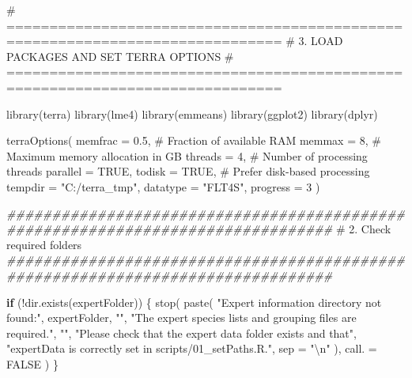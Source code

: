 \documentclass[
  letterpaper,
  DIV=11,
  numbers=noendperiod]{scrartcl}
\newenvironment{Shaded}{\begin{snugshade}}{\end{snugshade}}
\newcommand{\AttributeTok}[1]{\textcolor[rgb]{0.40,0.45,0.13}{#1}}
\newcommand{\CommentTok}[1]{\textcolor[rgb]{0.37,0.37,0.37}{#1}}
\newcommand{\ConstantTok}[1]{\textcolor[rgb]{0.56,0.35,0.01}{#1}}
\newcommand{\ControlFlowTok}[1]{\textcolor[rgb]{0.00,0.23,0.31}{\textbf{#1}}}
\newcommand{\DecValTok}[1]{\textcolor[rgb]{0.68,0.00,0.00}{#1}}
\newcommand{\DocumentationTok}[1]{\textcolor[rgb]{0.37,0.37,0.37}{\textit{#1}}}
\newcommand{\FloatTok}[1]{\textcolor[rgb]{0.68,0.00,0.00}{#1}}
\newcommand{\FunctionTok}[1]{\textcolor[rgb]{0.28,0.35,0.67}{#1}}
\newcommand{\NormalTok}[1]{\textcolor[rgb]{0.00,0.23,0.31}{#1}}
\newcommand{\SpecialCharTok}[1]{\textcolor[rgb]{0.37,0.37,0.37}{#1}}
\newcommand{\StringTok}[1]{\textcolor[rgb]{0.13,0.47,0.30}{#1}}
\begin{document}
\begin{Shaded}
\begin{Highlighting}[]
\CommentTok{\# ==============================================================================}
\CommentTok{\# 3. LOAD PACKAGES AND SET TERRA OPTIONS}
\CommentTok{\# ==============================================================================}

\FunctionTok{library}\NormalTok{(terra)}
\FunctionTok{library}\NormalTok{(lme4)}
\FunctionTok{library}\NormalTok{(emmeans)}
\FunctionTok{library}\NormalTok{(ggplot2)}
\FunctionTok{library}\NormalTok{(dplyr)}

\FunctionTok{terraOptions}\NormalTok{(}
    \AttributeTok{memfrac =} \FloatTok{0.5}\NormalTok{, }\CommentTok{\# Fraction of available RAM}
    \AttributeTok{memmax =} \DecValTok{8}\NormalTok{, }\CommentTok{\# Maximum memory allocation in GB}
    \AttributeTok{threads =} \DecValTok{4}\NormalTok{, }\CommentTok{\# Number of processing threads}
    \AttributeTok{parallel =} \ConstantTok{TRUE}\NormalTok{,}
    \AttributeTok{todisk =} \ConstantTok{TRUE}\NormalTok{, }\CommentTok{\# Prefer disk{-}based processing}
    \AttributeTok{tempdir =} \StringTok{"C:/terra\_tmp"}\NormalTok{,}
    \AttributeTok{datatype =} \StringTok{"FLT4S"}\NormalTok{,}
    \AttributeTok{progress =} \DecValTok{3}
\NormalTok{)}


\DocumentationTok{\#\#\#\#\#\#\#\#\#\#\#\#\#\#\#\#\#\#\#\#\#\#\#\#\#\#\#\#\#\#\#\#\#\#\#\#\#\#\#\#\#\#\#\#\#\#\#\#\#\#\#\#\#\#\#\#\#\#\#\#\#\#\#\#\#\#\#\#\#\#\#\#\#\#\#\#\#\#\#\#}
\CommentTok{\# 2. Check required folders}
\DocumentationTok{\#\#\#\#\#\#\#\#\#\#\#\#\#\#\#\#\#\#\#\#\#\#\#\#\#\#\#\#\#\#\#\#\#\#\#\#\#\#\#\#\#\#\#\#\#\#\#\#\#\#\#\#\#\#\#\#\#\#\#\#\#\#\#\#\#\#\#\#\#\#\#\#\#\#\#\#\#\#\#\#}

\ControlFlowTok{if}\NormalTok{ (}\SpecialCharTok{!}\FunctionTok{dir.exists}\NormalTok{(expertFolder)) \{}
  \FunctionTok{stop}\NormalTok{(}
    \FunctionTok{paste}\NormalTok{(}
      \StringTok{"Expert information directory not found:"}\NormalTok{,}
\NormalTok{      expertFolder,}
      \StringTok{""}\NormalTok{,}
      \StringTok{"The expert species lists and grouping files are required."}\NormalTok{,}
      \StringTok{""}\NormalTok{,}
      \StringTok{"Please check that the expert data folder exists and that"}\NormalTok{,}
      \StringTok{"\textquotesingle{}expertData\textquotesingle{} is correctly set in scripts/01\_setPaths.R."}\NormalTok{,}
      \AttributeTok{sep =} \StringTok{"}\SpecialCharTok{\textbackslash{}n}\StringTok{"}
\NormalTok{    ),}
    \AttributeTok{call. =} \ConstantTok{FALSE}
\NormalTok{  )}
\NormalTok{\}}



\end{Highlighting}
\end{Shaded}
\end{document}
